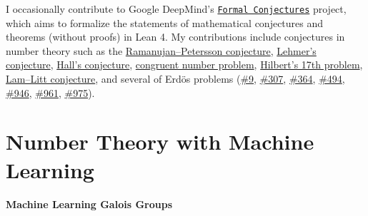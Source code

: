 \documentclass[letterpaper, 10pt]{article}
\begin{document}
I occasionally contribute to Google DeepMind's \href{https://github.com/google-deepmind/formal-conjectures}{\texttt{Formal Conjectures}} project, which aims to formalize the statements of mathematical conjectures and theorems (without proofs) in Lean 4.
My contributions include conjectures in number theory such as the \href{https://github.com/google-deepmind/formal-conjectures/pull/119}{Ramanujan--Petersson conjecture}, \href{https://github.com/google-deepmind/formal-conjectures/pull/139}{Lehmer's conjecture}, \href{https://github.com/google-deepmind/formal-conjectures/issues/184}{Hall's conjecture}, \href{https://github.com/google-deepmind/formal-conjectures/pull/317}{congruent number problem}, \href{https://github.com/google-deepmind/formal-conjectures/pull/1678}{Hilbert's 17th problem}, \href{https://github.com/google-deepmind/formal-conjectures/pull/4058}{Lam--Litt conjecture}, and several of Erd\"os problems (\href{https://github.com/google-deepmind/formal-conjectures/pull/300}{\#9}, \href{https://github.com/google-deepmind/formal-conjectures/pull/301}{\#307}, \href{https://github.com/google-deepmind/formal-conjectures/pull/449}{\#364}, \href{https://github.com/google-deepmind/formal-conjectures/pull/1425}{\#494}, \href{https://github.com/google-deepmind/formal-conjectures/pull/665}{\#946}, \href{https://github.com/google-deepmind/formal-conjectures/pull/1427}{\#961}, \href{https://github.com/google-deepmind/formal-conjectures/pull/691}{\#975}).


\section{Number Theory with Machine Learning}

\paragraph{Machine Learning Galois Groups}
\end{document}
